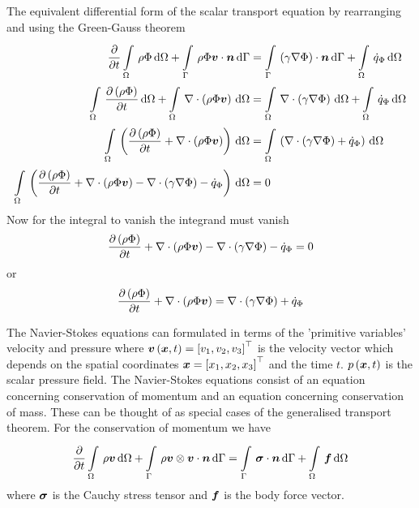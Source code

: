 The equivalent differential form of the scalar transport equation by
rearranging  and using the Green-Gauss
theorem \ie
\begin{equation}
  \begin{split}
    \delby{}{t}\gint{\Omega}{}{\rho\Phi}{\Omega}+\gint{\Gamma}{}{\dotprod{\rho\Phi\vectr{v}}{\vectr{n}}}{\Gamma}
    &=\gint{\Gamma}{}{\dotprod{\pbrac{\gamma\gradient{}{\Phi}}}{\vectr{n}}}{\Gamma}+\gint{\Omega}{}{\dot{q}_{\Phi}}{\Omega}\\
    \gint{\Omega}{}{\delby{\pbrac{\rho\Phi}}{t}}{\Omega}+\gint{\Omega}{}{\divergence{}{\pbrac{\rho\Phi\vectr{v}}}}{\Omega}
    &=\gint{\Omega}{}{\divergence{}{\pbrac{\gamma\gradient{}{\Phi}}}}{\Omega}+\gint{\Omega}{}{\dot{q}_{\Phi}}{\Omega}
    \\
    \gint{\Omega}{}{\pbrac{\delby{\pbrac{\rho\Phi}}{t}+\divergence{}{\pbrac{\rho\Phi\vectr{v}}}}}{\Omega}
    &=\gint{\Omega}{}{\pbrac{\divergence{}{\pbrac{\gamma\gradient{}{\Phi}}}+\dot{q}_{\Phi}}}{\Omega}
    \\
    \gint{\Omega}{}{\pbrac{\delby{\pbrac{\rho\Phi}}{t}+\divergence{}{\pbrac{\rho\Phi\vectr{v}}}-
        \divergence{}{\pbrac{\gamma\gradient{}{\Phi}}}-\dot{q}_{\Phi}}}{\Omega}
    &= 0
  \end{split}
\end{equation}
Now for the integral to vanish the integrand must vanish \ie
\begin{equation}
  \delby{\pbrac{\rho\Phi}}{t}+\divergence{}{\pbrac{\rho\Phi\vectr{v}}}
  -\divergence{}{\pbrac{\gamma\gradient{}{\Phi}}}-\dot{q}_{\Phi}=0
\end{equation}
or
\begin{equation}
  \delby{\pbrac{\rho\Phi}}{t}+\divergence{}{\pbrac{\rho\Phi\vectr{v}}}=\divergence{}{\pbrac{\gamma\gradient{}{\Phi}}}+\dot{q}_{\Phi}
  \label{eqn:differentialgenscalartransport}
\end{equation}

The Navier-Stokes equations can formulated in terms of the 'primitive
variables' \ie velocity and pressure where
$  \boldsymbol{v} \left(  \boldsymbol{x} ,t \right) = {\left[ v_{1},v_{2},v_{3} \right]}^{ \top } $ is the
velocity vector which depends on the spatial coordinates
$ \boldsymbol{x} = {\left[ x_{1},x_{2},x_{3} \right]}^{ \top } $ and the time
$t$. $ p\left(  \boldsymbol{x} ,t \right) $ is the scalar pressure field. The Navier-Stokes
equations consist of an equation concerning conservation of momentum and an
equation concerning conservation of mass. These can be thought of as special
cases of the generalised transport theorem. For the conservation of momentum
we have
\begin{equation}
  \delby{}{t}\gint{\Omega}{}{\rho\vectr{v}}{\Omega}
  +\gint{\Gamma}{}{\dotprod{\tensorprod{\rho\vectr{v}}{\vectr{v}}}{\vectr{n}}}{\Gamma}
  =\gint{\Gamma}{}{\dotprod{\tensor{\sigma}}{\vectr{n}}}{\Gamma}+\gint{\Omega}{}{\vectr{f}}{\Omega}
\end{equation}
where $\boldsymbol{\mathit{\sigma}}$ is the Cauchy stress tensor and $ \boldsymbol{f} $ is the body force
vector.

